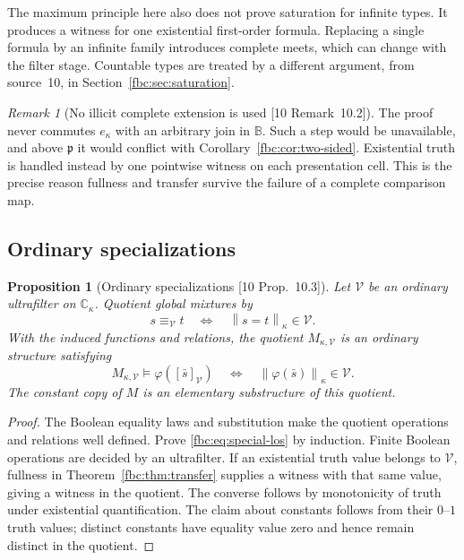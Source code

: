 \documentclass[11pt,letterpaper]{article}
\newtheorem{proposition}[theorem]{Proposition}
\theoremstyle{definition}
\theoremstyle{remark}
\newtheorem{remark}[theorem]{Remark}
\newcommand{\B}{\mathbb B}
\newcommand{\C}{\mathbb C}
\newcommand{\cp}{\mathfrak p}
\newcommand{\cV}{\mathcal V}
\newcommand{\truth}[1]{\left\lVert #1\right\rVert}
\newcommand{\src}[1]{\textup{[#1]}}
\begin{document}
The maximum principle here also does not prove saturation for
infinite types. It produces a witness for one existential
first-order formula. Replacing a single formula by an infinite
family introduces complete meets, which can change with the
filter stage. Countable types are treated by a different argument, from
source~10, in Section~\ref{fbc:sec:saturation}.

\begin{remark}[No illicit complete extension is used \src{10 Remark~10.2}]\label{fbc:rem:no-illicit}
The proof never commutes $e_\kappa$ with an arbitrary join in $\B$. Such
a step would be unavailable, and above $\cp$ it would conflict with
Corollary~\ref{fbc:cor:two-sided}. Existential truth is handled instead
by one pointwise witness on each presentation cell. This is the precise
reason fullness and transfer survive the failure of a complete
comparison map.
\end{remark}

\subsection{Ordinary specializations}
\begin{proposition}[Ordinary specializations \src{10 Prop.~10.3}]
\label{fbc:prop:specialize}
Let $\cV$ be an ordinary ultrafilter on $\C_\kappa$. Quotient global
mixtures by
\[
 s\equiv_\cV t\quad\Longleftrightarrow\quad\truth{s=t}_\kappa\in\cV.
\]
With the induced functions and relations, the quotient $M_{\kappa,\cV}$
is an ordinary structure satisfying
\begin{equation}\label{fbc:eq:special-los}
 M_{\kappa,\cV}\models\varphi([\bar s]_\cV)
       \quad\Longleftrightarrow\quad\truth{\varphi(\bar s)}_\kappa\in\cV.
\end{equation}
The constant copy of $M$ is an elementary substructure of this quotient.
\end{proposition}
\begin{proof}
The Boolean equality laws and substitution make the quotient operations
and relations well defined. Prove \eqref{fbc:eq:special-los} by
induction. Finite Boolean operations are decided by an ultrafilter. If
an existential truth value belongs to $\cV$, fullness in
Theorem~\ref{fbc:thm:transfer} supplies a witness with that same value,
giving a witness in the quotient. The converse follows by monotonicity
of truth under existential quantification. The claim about constants
follows from their $0$--$1$ truth values; distinct constants have
equality value zero and hence remain distinct in the quotient.
\end{proof}
\end{document}
